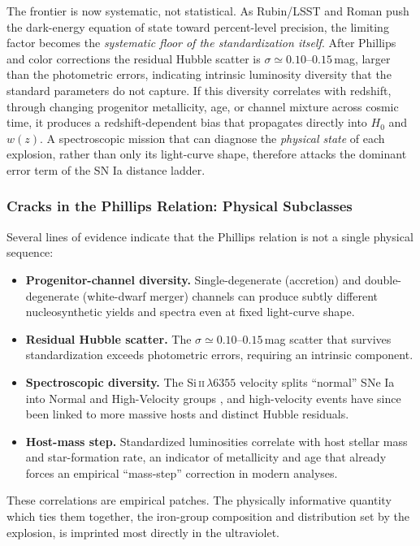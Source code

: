 \documentclass[10pt,onecolumn]{article}
\begin{document}
The frontier is now systematic, not statistical. As Rubin/LSST and Roman push the dark-energy equation of state toward percent-level precision, the limiting factor becomes the \emph{systematic floor of the standardization itself}. After Phillips and color corrections the residual Hubble scatter is $\sigma\simeq0.10$--$0.15$\,mag, larger than the photometric errors, indicating intrinsic luminosity diversity that the standard parameters do not capture. If this diversity correlates with redshift, through changing progenitor metallicity, age, or channel mixture across cosmic time, it produces a redshift-dependent bias that propagates directly into $H_0$ and $w(z)$. A spectroscopic mission that can diagnose the \emph{physical state} of each explosion, rather than only its light-curve shape, therefore attacks the dominant error term of the SN Ia distance ladder.

\subsubsection{Cracks in the Phillips Relation: Physical Subclasses}

Several lines of evidence indicate that the Phillips relation is not a single physical sequence:
\begin{itemize}
\item \textbf{Progenitor-channel diversity.} Single-degenerate (accretion) and double-degenerate (white-dwarf merger) channels can produce subtly different nucleosynthetic yields and spectra even at fixed light-curve shape.
\item \textbf{Residual Hubble scatter.} The $\sigma\simeq0.10$--$0.15$\,mag scatter that survives standardization exceeds photometric errors, requiring an intrinsic component.
\item \textbf{Spectroscopic diversity.} The Si\,\textsc{ii}\,$\lambda6355$ velocity splits ``normal'' SNe Ia into Normal and High-Velocity groups \cite{wang2009}, and high-velocity events have since been linked to more massive hosts and distinct Hubble residuals.
\item \textbf{Host-mass step.} Standardized luminosities correlate with host stellar mass and star-formation rate, an indicator of metallicity and age that already forces an empirical ``mass-step'' correction in modern analyses.
\end{itemize}
These correlations are empirical patches. The physically informative quantity which ties them together, the iron-group composition and distribution set by the explosion, is imprinted most directly in the ultraviolet.
\end{document}
